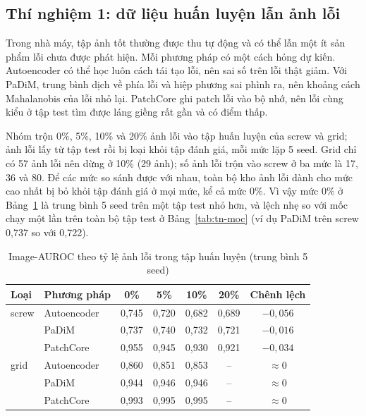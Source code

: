 \subsection{Thí nghiệm 1: dữ liệu huấn luyện lẫn ảnh lỗi}
\label{sec:tn1}

Trong nhà máy, tập ảnh tốt thường được thu tự động và có thể lẫn một ít sản phẩm lỗi chưa được phát hiện. Mỗi phương
pháp có một cách hỏng dự kiến. Autoencoder có thể học luôn cách tái tạo lỗi, nên sai số trên lỗi thật giảm. Với PaDiM,
trung bình dịch về phía lỗi và hiệp phương sai phình ra, nên khoảng cách Mahalanobis của lỗi nhỏ lại. PatchCore ghi
patch lỗi vào bộ nhớ, nên lỗi cùng kiểu ở tập test tìm được láng giềng rất gần và có điểm thấp.

Nhóm trộn 0\%, 5\%, 10\% và 20\% ảnh lỗi vào tập huấn luyện của screw và grid; ảnh lỗi lấy từ tập test rồi bị loại
khỏi tập đánh giá, mỗi mức lặp 5 seed. Grid chỉ có 57 ảnh lỗi nên dừng ở 10\% (29 ảnh); số ảnh lỗi trộn vào screw ở
ba mức là 17, 36 và 80. Để các mức so sánh được với nhau, toàn bộ kho ảnh lỗi dành cho mức cao nhất bị bỏ khỏi tập
đánh giá ở mọi mức, kể cả mức 0\%. Vì vậy mức 0\% ở Bảng~\ref{tab:tn1} là trung bình 5 seed trên một tập test nhỏ hơn,
và lệch nhẹ so với mốc chạy một lần trên toàn bộ tập test ở Bảng~\ref{tab:tn-moc} (ví dụ PaDiM trên screw 0,737 so
với 0,722).

\begin{table}[htbp]
  \centering
  \caption{Image-AUROC theo tỷ lệ ảnh lỗi trong tập huấn luyện (trung bình 5 seed)}
  \label{tab:tn1}
  \begin{tabular}{@{}llccccc@{}}
    \toprule
    Loại & Phương pháp & 0\% & 5\% & 10\% & 20\% & Chênh lệch \\
    \midrule
    screw & Autoencoder & 0,745 & 0,720 & 0,682 & 0,689 & $-0{,}056$ \\
          & PaDiM       & 0,737 & 0,740 & 0,732 & 0,721 & $-0{,}016$ \\
          & PatchCore   & 0,955 & 0,945 & 0,930 & 0,921 & $-0{,}034$ \\
    \midrule
    grid  & Autoencoder & 0,860 & 0,851 & 0,853 & -- & $\approx 0$ \\
          & PaDiM       & 0,944 & 0,946 & 0,946 & -- & $\approx 0$ \\
          & PatchCore   & 0,993 & 0,995 & 0,995 & -- & $\approx 0$ \\
    \bottomrule
  \end{tabular}
\end{table}

